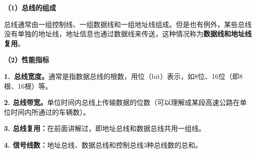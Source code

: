 {\textbf{（1）总线的组成}}

总线通常由一组控制线、一组数据线和一组地址线组成。但是也有例外，某些总线没有单独的地址线，地址信息也通过数据线来传送，这种情况称为\textbf{数据线和地址线复用}。

{\textbf{（2）性能指标}}

\textbf{1.~总线宽度。}通常是指数据总线的根数，用位（bit）表示，如8位、16位（即8根、16根）等。

\textbf{2.
总线带宽。}单位时间内总线上传输数据的位数（可以理解成某段高速公路在单位时间内所通过的车辆数）。

\textbf{3. 总线复用：}在前面讲解过，即地址总线和数据总线共用一组线。

\textbf{4. 信号线数：}地址总线、数据总线和控制总线3种总线数的总和。\\
